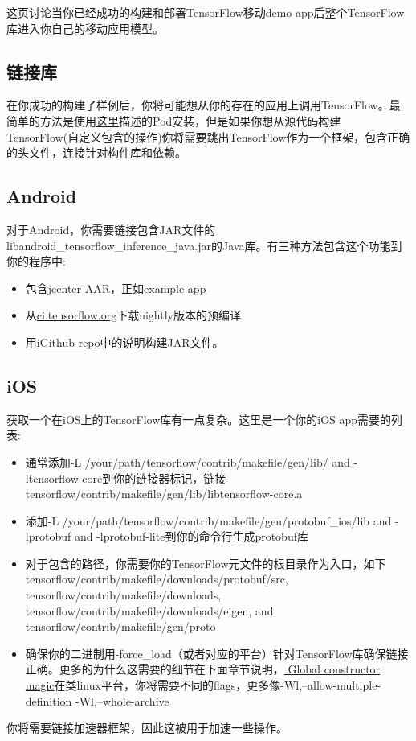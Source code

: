 这页讨论当你已经成功的构建和部署TensorFlow移动demo app后整个TensorFlow库进入你自己的移动应用模型。
\subsection{链接库}
在你成功的构建了样例后，你将可能想从你的存在的应用上调用TensorFlow。最简单的方法是使用\href{https://www.tensorflow.org/mobile/ios_build?hl=zh-cn#using_cocoapods}{这里}描述的Pod安装，但是如果你想从源代码构建TensorFlow(自定义包含的操作)你将需要跳出TensorFlow作为一个框架，包含正确的头文件，连接针对构件库和依赖。
\subsection{Android}
对于Android，你需要链接包含JAR文件的libandroid\_tensorflow\_inference\_java.jar的Java库。有三种方法包含这个功能到你的程序中:
\begin{itemize}
\item 包含jcenter AAR，正如\href{https://github.com/googlecodelabs/tensorflow-for-poets-2/blob/master/android/build.gradle#L59-L65}{example app}
\item 从\href{http://ci.tensorflow.org/view/Nightly/job/nightly-android/lastSuccessfulBuild/artifact/out/?hl=zh-cn}{ci.tensorflow.org}下载nightly版本的预编译
\item 用\href{https://github.com/tensorflow/tensorflow/tree/master/tensorflow/contrib/android}{iGithub repo}中的说明构建JAR文件。
\end{itemize}
\subsection{iOS}

获取一个在iOS上的TensorFlow库有一点复杂。这里是一个你的iOS app需要的列表:
\begin{itemize}
\item 通常添加-L /your/path/tensorflow/contrib/makefile/gen/lib/ and -ltensorflow-core到你的链接器标记，链接 tensorflow/contrib/makefile/gen/lib/libtensorflow-core.a
\item 添加-L /your/path/tensorflow/contrib/makefile/gen/protobuf\_ios/lib and -lprotobuf and -lprotobuf-lite到你的命令行生成protobuf库
\item 对于包含的路径，你需要你的TensorFlow元文件的根目录作为入口，如下tensorflow/contrib/makefile/downloads/protobuf/src, tensorflow/contrib/makefile/downloads, tensorflow/contrib/makefile/downloads/eigen, and tensorflow/contrib/makefile/gen/proto 
\item 确保你的二进制用-force\_load（或者对应的平台）针对TensorFlow库确保链接正确。更多的为什么这需要的细节在下面章节说明，\href{https://www.tensorflow.org/mobile/linking_libs?hl=zh-cn#global_constructor_magic}{ Global constructor magic}在类linux平台，你将需要不同的flags，更多像-Wl,--allow-multiple-definition -Wl,--whole-archive
\end{itemize}
你将需要链接加速器框架，因此这被用于加速一些操作。
